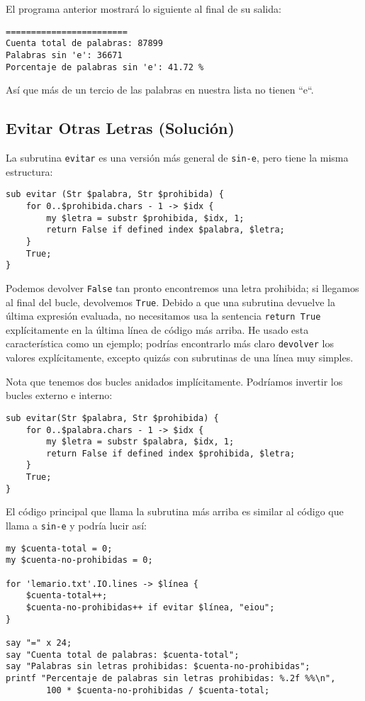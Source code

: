El programa anterior mostrará lo siguiente al final de 
su salida:

\begin{verbatim}
========================
Cuenta total de palabras: 87899
Palabras sin 'e': 36671
Porcentaje de palabras sin 'e': 41.72 %
\end{verbatim}

Así que más de un tercio de las palabras en nuestra lista no
tienen ``e``.

\subsection{Evitar Otras Letras (Solución)}

La subrutina {\tt evitar} es una versión más general de 
\verb|sin-e|, pero tiene la misma estructura:

\begin{verbatim}
sub evitar (Str $palabra, Str $prohibida) {
    for 0..$prohibida.chars - 1 -> $idx {
        my $letra = substr $prohibida, $idx, 1;
        return False if defined index $palabra, $letra;
    }
    True;
}

\end{verbatim}
%
Podemos devolver {\tt False} tan pronto encontremos una letra
prohibida; si llegamos al final del bucle, devolvemos {\tt True}.
Debido a que una subrutina devuelve la última expresión evaluada,
no necesitamos usa la sentencia {\tt return True} explícitamente
en la última línea de código más arriba. He usado esta característica
como un ejemplo; podrías encontrarlo más claro {\tt devolver} los valores 
explícitamente, excepto quizás con subrutinas de una línea muy simples.

Nota que tenemos dos bucles anidados implícitamente. Podríamos 
invertir los bucles externo e interno:

\begin{verbatim}
sub evitar(Str $palabra, Str $prohibida) {
    for 0..$palabra.chars - 1 -> $idx {
        my $letra = substr $palabra, $idx, 1;
        return False if defined index $prohibida, $letra;
    }
    True;
}
\end{verbatim}
%

El código principal que llama la subrutina más arriba es similar
al código que llama a {\tt sin-e} y podría lucir así:

\begin{verbatim}
my $cuenta-total = 0;
my $cuenta-no-prohibidas = 0;

for 'lemario.txt'.IO.lines -> $línea { 
    $cuenta-total++;
    $cuenta-no-prohibidas++ if evitar $línea, "eiou";
}

say "=" x 24;
say "Cuenta total de palabras: $cuenta-total";
say "Palabras sin letras prohibidas: $cuenta-no-prohibidas";
printf "Percentaje de palabras sin letras prohibidas: %.2f %%\n", 
        100 * $cuenta-no-prohibidas / $cuenta-total;
\end{verbatim}    
%
  

